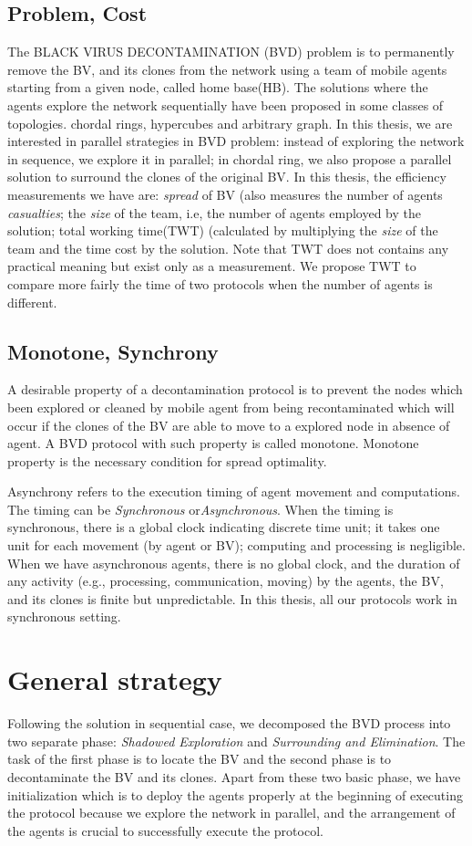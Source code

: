 \subsection{Problem, Cost}
The BLACK VIRUS DECONTAMINATION (BVD) problem is to permanently remove the BV, and its clones from the network using a team of mobile agents starting from a given node, called home base(HB). The solutions where the agents explore the network sequentially have been proposed in some classes of topologies. chordal rings, hypercubes and arbitrary graph. In this thesis, we are interested in parallel strategies in BVD problem: instead of exploring the network in sequence, we explore it in parallel; in chordal ring, we also propose a parallel solution to surround the clones of the original BV. 
In this thesis, the efficiency measurements we have are: {\em spread} of BV (also measures the number of agents {\em casualties}; the {\em size} of the team, i.e, the number of agents employed by the solution; total working time(TWT) (calculated by multiplying the {\em size} of the team and the time cost by the solution. Note that TWT does not contains any practical meaning but exist only as a measurement. We propose TWT to compare more fairly the time of two protocols when the number of agents is different.

\subsection{Monotone, Synchrony}
A desirable property of a decontamination protocol is to prevent the nodes which been explored or cleaned by mobile agent from being recontaminated which will occur if the clones of the BV are able to move to a explored node in absence of agent. A BVD protocol with such property is called monotone. Monotone property is the necessary condition for spread optimality.

Asynchrony refers to the execution timing of agent movement and computations. The timing can be {\em Synchronous} or{\em Asynchronous}. When the timing is synchronous, there is a global clock indicating discrete time unit; it takes one unit for each movement (by agent or BV); computing and processing is negligible. When we have asynchronous agents, there is no global clock, and the duration of any activity (e.g., processing, communication, moving) by the agents, the BV, and its clones is finite but unpredictable. In this thesis, all our protocols work in synchronous setting.

\section{ General strategy}
Following the solution in sequential case, we decomposed the BVD process into two separate phase: {\em Shadowed Exploration} and {\em Surrounding and Elimination}. The task of the first phase is to locate the BV and the second phase is to decontaminate the BV and its clones. Apart from these two basic phase, we have initialization which is to deploy the agents properly at the beginning of executing the protocol because we explore the network in parallel, and the arrangement of the agents is crucial to successfully execute the protocol. 

